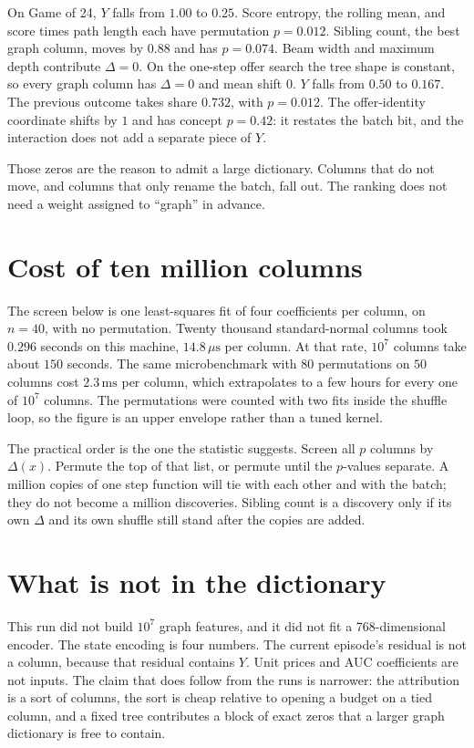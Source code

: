\documentclass[11pt,a4paper]{article}
\begin{document}
On Game of 24, \(Y\) falls from \(1.00\) to \(0.25\).
Score entropy, the rolling mean, and score times path length each have permutation \(p=0.012\).
Sibling count, the best graph column, moves by \(0.88\) and has \(p=0.074\).
Beam width and maximum depth contribute \(\Delta=0\).
On the one-step offer search the tree shape is constant, so every graph column has \(\Delta=0\) and mean shift \(0\).
\(Y\) falls from \(0.50\) to \(0.167\).
The previous outcome takes share \(0.732\), with \(p=0.012\).
The offer-identity coordinate shifts by \(1\) and has concept \(p=0.42\): it restates the batch bit, and the interaction does not add a separate piece of \(Y\).

Those zeros are the reason to admit a large dictionary.
Columns that do not move, and columns that only rename the batch, fall out.
The ranking does not need a weight assigned to ``graph'' in advance.

\section{Cost of ten million columns}
The screen below is one least-squares fit of four coefficients per column, on \(n=40\), with no permutation.
Twenty thousand standard-normal columns took \(0.296\) seconds on this machine, \(14.8\,\mu\mathrm{s}\) per column.
At that rate, \(10^{7}\) columns take about \(150\) seconds.
The same microbenchmark with \(80\) permutations on \(50\) columns cost \(2.3\,\mathrm{ms}\) per column, which extrapolates to a few hours for every one of \(10^{7}\) columns.
The permutations were counted with two fits inside the shuffle loop, so the figure is an upper envelope rather than a tuned kernel.

The practical order is the one the statistic suggests.
Screen all \(p\) columns by \(\Delta(x)\).
Permute the top of that list, or permute until the \(p\)-values separate.
A million copies of one step function will tie with each other and with the batch; they do not become a million discoveries.
Sibling count is a discovery only if its own \(\Delta\) and its own shuffle still stand after the copies are added.

\section{What is not in the dictionary}
This run did not build \(10^{7}\) graph features, and it did not fit a 768-dimensional encoder.
The state encoding is four numbers.
The current episode's residual is not a column, because that residual contains \(Y\).
Unit prices and AUC coefficients are not inputs.
The claim that does follow from the runs is narrower:
the attribution is a sort of columns, the sort is cheap relative to opening a budget on a tied column, and a fixed tree contributes a block of exact zeros that a larger graph dictionary is free to contain.
\end{document}
